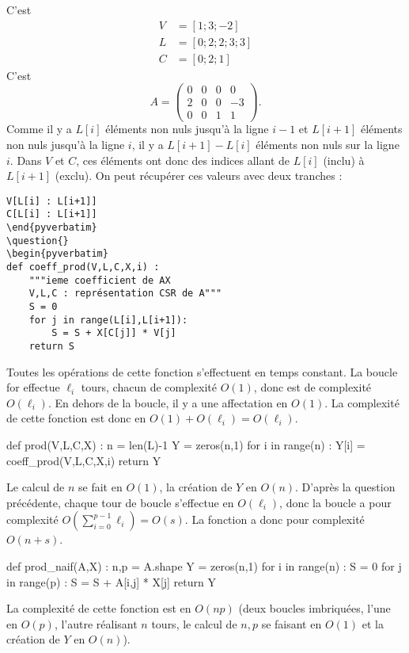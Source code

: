 \question{} C'est 
\begin{align*}
    V &= [1 ; 3 ; -2 ] \\
    L &= [0 ; 2 ; 2 ; 3 ; 3] \\
    C &= [0 ; 2 ; 1 ]
\end{align*}
\question{} C'est 
\begin{equation*}
    A = \begin{pmatrix} 0 & 0 & 0 & 0 \\ 2 & 0 & 0 & -3 \\ 0 & 0 & 1 & 1 \end{pmatrix}. 
\end{equation*}
\question{} Comme il y a $L[i]$ éléments non nuls jusqu'à la ligne \no$i-1$ et $L[i+1]$ éléments non nuls jusqu'à la ligne \no$i$, il y a $L[i+1] - L[i]$ éléments non nuls sur la ligne \no$i$.
Dans $V$ et $C$, ces éléments ont donc des indices allant de $L[i]$ (inclu) à $L[i+1]$ (exclu). On peut récupérer ces valeurs avec deux tranches : 
\begin{verbatim}
V[L[i] : L[i+1]]
C[L[i] : L[i+1]]
\end{pyverbatim}
\question{}
\begin{pyverbatim}
def coeff_prod(V,L,C,X,i) : 
    """ieme coefficient de AX
    V,L,C : représentation CSR de A"""
    S = 0
    for j in range(L[i],L[i+1]):
        S = S + X[C[j]] * V[j]
    return S
\end{verbatim}
Toutes les opérations de cette fonction s'effectuent en temps constant. La boucle for effectue $\ell_i$ tours, chacun de complexité $O(1)$, donc est de complexité $O(\ell_i)$. 
En dehors de la boucle, il y a une affectation en $O(1)$. 
La complexité de cette fonction est donc en $O(1) + O(\ell_i) = O(\ell_i)$. 

\question{} 
\begin{pyverbatim}
def prod(V,L,C,X) : 
    n = len(L)-1
    Y = zeros(n,1)
    for i in range(n) : 
        Y[i] = coeff_prod(V,L,C,X,i)
    return Y
\end{pyverbatim}
Le calcul de $n$ se fait en $O(1)$, la création de $Y$ en $O(n)$. 
D'après la question précédente, chaque tour de boucle s'effectue en $O(\ell_i)$, donc la boucle a pour complexité $O(\sum_{i=0}^{p-1}\ell_i) = O(s)$. 
La fonction a donc pour complexité $O(n+s)$. 

\question{}
\begin{pyverbatim}
def prod_naif(A,X) : 
    n,p = A.shape
    Y = zeros(n,1)
    for i in range(n) : 
        S = 0
        for j in range(p) : 
            S = S + A[i,j] * X[j]
    return Y
\end{pyverbatim}
La complexité de cette fonction est en $O(np)$ (deux boucles imbriquées, l'une en $O(p)$, l'autre réalisant $n$ tours, le calcul de $n,p$ se faisant en $O(1)$ et la création de $Y$ en $O(n)$).

